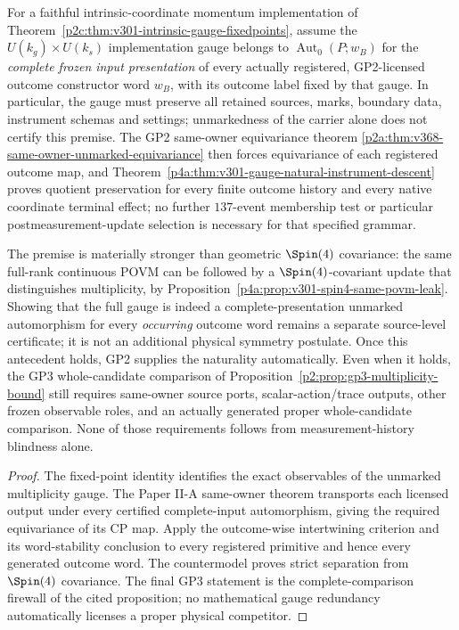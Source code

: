 \documentclass[11pt,a4paper]{article}
\begin{document}
\begin{corollary}
\label{p2f:cor:v301-gauge-naturality-gp3-certificate}
For a faithful intrinsic-coordinate momentum implementation of
Theorem~\ref{p2c:thm:v301-intrinsic-gauge-fixedpoints}, assume the $U(k_g)\times U(k_s)$ implementation gauge
belongs to $\operatorname{Aut}_0(P;w_B)$ for the \emph{complete
frozen input presentation} of every actually registered, GP2-licensed
outcome constructor word $w_B$, with its outcome label fixed by that
gauge. In particular, the gauge must preserve all retained sources,
marks, boundary data, instrument schemas and settings; unmarkedness
of the carrier alone does not certify this premise. The GP2
same-owner equivariance theorem
\ref{p2a:thm:v368-same-owner-unmarked-equivariance}
then forces equivariance of each registered outcome map, and
Theorem~\ref{p4a:thm:v301-gauge-natural-instrument-descent}
proves quotient preservation for every finite outcome history and
every native coordinate terminal effect; no further $137$-event
membership test or particular postmeasurement-update selection
is necessary for that specified grammar.

The premise is materially stronger than geometric
$\Spin(4)$ covariance: the same full-rank continuous POVM can
be followed by a $\Spin(4)$-covariant update that distinguishes
multiplicity, by
Proposition~\ref{p4a:prop:v301-spin4-same-povm-leak}.
Showing that the full gauge is indeed a complete-presentation
unmarked automorphism for every \emph{occurring} outcome word remains a
separate source-level certificate; it is not an additional physical
symmetry postulate. Once this antecedent holds, GP2 supplies the
naturality automatically. Even when it holds, the GP3 whole-candidate
comparison of Proposition~\ref{p2:prop:gp3-multiplicity-bound}
still requires same-owner source ports, scalar-action/trace outputs,
other frozen observable roles, and an actually generated proper
whole-candidate comparison. None of those requirements follows
from measurement-history blindness alone.
\end{corollary}
\begin{proof}
The fixed-point identity identifies the exact observables of the
unmarked multiplicity gauge. The Paper II-A same-owner theorem
transports each licensed output under every certified complete-input
automorphism, giving the required equivariance of its CP map.
Apply the outcome-wise intertwining
criterion and its word-stability conclusion to every registered
primitive and hence every generated outcome word. The countermodel
proves strict separation from $\Spin(4)$ covariance. The final
GP3 statement is the complete-comparison firewall of the cited
proposition; no mathematical gauge redundancy automatically
licenses a proper physical competitor.
\end{proof}
\end{document}
